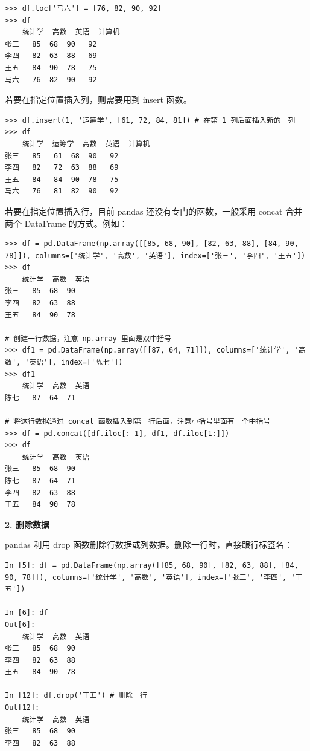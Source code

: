 \begin{lstlisting}[Language=Python]
>>> df.loc['马六'] = [76, 82, 90, 92]
>>> df
    统计学  高数  英语  计算机
张三   85  68  90   92
李四   82  63  88   69
王五   84  90  78   75
马六   76  82  90   92
\end{lstlisting}

若要在指定位置插入列，则需要用到 insert 函数。

\begin{lstlisting}[Language=Python]
>>> df.insert(1, '运筹学', [61, 72, 84, 81]) # 在第 1 列后面插入新的一列
>>> df
    统计学  运筹学  高数  英语  计算机
张三   85   61  68  90   92
李四   82   72  63  88   69
王五   84   84  90  78   75
马六   76   81  82  90   92
\end{lstlisting}

若要在指定位置插入行，目前 pandas 还没有专门的函数，一般采用 concat 合并两个 DataFrame 的方式。例如：

\begin{lstlisting}[Language=Python]
>>> df = pd.DataFrame(np.array([[85, 68, 90], [82, 63, 88], [84, 90, 78]]), columns=['统计学', '高数', '英语'], index=['张三', '李四', '王五'])
>>> df
    统计学  高数  英语
张三   85  68  90
李四   82  63  88
王五   84  90  78

# 创建一行数据，注意 np.array 里面是双中括号
>>> df1 = pd.DataFrame(np.array([[87, 64, 71]]), columns=['统计学', '高数', '英语'], index=['陈七'])
>>> df1
    统计学  高数  英语
陈七   87  64  71

# 将这行数据通过 concat 函数插入到第一行后面，注意小括号里面有一个中括号
>>> df = pd.concat([df.iloc[: 1], df1, df.iloc[1:]])
>>> df
    统计学  高数  英语
张三   85  68  90
陈七   87  64  71
李四   82  63  88
王五   84  90  78
\end{lstlisting}

\vspace{3pt}
\noindent\textbf{2. 删除数据}
\vspace{3pt}

pandas 利用 drop 函数删除行数据或列数据。删除一行时，直接跟行标签名：

\begin{lstlisting}[Language=Python]
In [5]: df = pd.DataFrame(np.array([[85, 68, 90], [82, 63, 88], [84, 90, 78]]), columns=['统计学', '高数', '英语'], index=['张三', '李四', '王五'])

In [6]: df
Out[6]:
    统计学  高数  英语
张三   85  68  90
李四   82  63  88
王五   84  90  78

In [12]: df.drop('王五') # 删除一行
Out[12]:
    统计学  高数  英语
张三   85  68  90
李四   82  63  88
\end{lstlisting}

